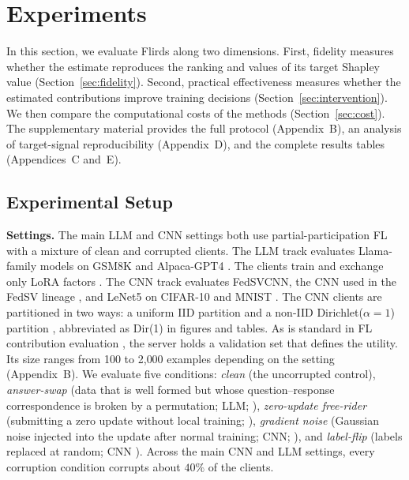 \documentclass[letterpaper]{article} %
\theoremstyle{definition} %
\begin{document}
\section{Experiments}
\label{sec:experiments}

In this section, we evaluate Flirds along two
dimensions. First, fidelity measures whether the estimate reproduces the
ranking and values of its target Shapley value
(Section~\ref{sec:fidelity}). Second, practical effectiveness measures whether
the estimated contributions improve training decisions
(Section~\ref{sec:intervention}). We then compare the computational costs of
the methods (Section~\ref{sec:cost}). The supplementary material provides the
full protocol (Appendix~B), an analysis of target-signal reproducibility
(Appendix~D), and the complete results tables (Appendices~C and~E).

\subsection{Experimental Setup}
\label{sec:setup}

\textbf{Settings.} The main LLM and CNN settings both use partial-participation
FL with a mixture of clean and corrupted clients. The LLM track evaluates
Llama-family models
\citep{grattafiori2024llama,touvron2023llama} on GSM8K
\citep{cobbe2021training} and Alpaca-GPT4 \citep{peng2023instruction}. The
clients train and exchange only LoRA factors \citep{hu2022lora}. 
The CNN track evaluates FedSVCNN, the CNN used in the FedSV
lineage \citep{wang2020principled,fan2022improving}, and LeNet5
\citep{lecun1998gradient} on CIFAR-10 \citep{krizhevsky2009learning}
and MNIST \citep{lecun1998gradient}. The CNN clients are partitioned in two
ways: a uniform IID partition
and a non-IID Dirichlet($\alpha{=}1$) partition \citep{hsu2019measuring},
abbreviated as Dir(1) in figures and tables. As is standard in FL contribution
evaluation \citep{wang2020principled,liu2022gtg,fan2022improving}, the server
holds a validation set that defines the utility. Its size ranges from 100 to
2{,}000 examples depending on the setting (Appendix~B). We evaluate five
conditions: \emph{clean} (the uncorrupted control), \emph{answer-swap}
(data that is well formed but whose question--response correspondence is
broken by a permutation; LLM; \citealp{xu2024instructions}), \emph{zero-update free-rider} (submitting a
zero update without local training; \citealp{lin2019free}), \emph{gradient
noise} (Gaussian noise injected into the update after normal training; CNN; \citealp{blanchard2017machine}),
and \emph{label-flip}
(labels replaced at random; CNN \citealp{xu2022fedcorr}). Across the main CNN and LLM settings, every corruption condition corrupts about
$40\%$ of the clients. 
\end{document}
